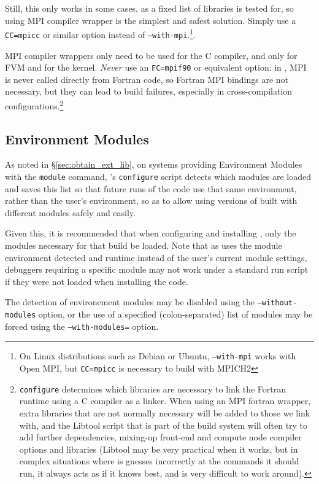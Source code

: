 \documentclass[a4paper,10pt,twoside]{article}
\begin{document}
Still, this only works in some cases, as a fixed list of libraries
is tested for, so using MPI compiler wrapper is the simplest and safest
solution. Simply use a \texttt{CC=mpicc} or similar option instead
of \texttt{--with-mpi}.\footnote{On Linux distributions such
as Debian or Ubuntu, \texttt{--with-mpi} works with Open MPI, but
\texttt{CC=mpicc} is necessary to build with MPICH2}.

MPI compiler wrappers only need to be used for the C compiler,
and only for FVM and for the kernel.
\emph{Never} use an \texttt{FC=mpif90}
or equivalent option: in \CS, MPI is never called directly from Fortran code,
so Fortran MPI bindings are not necessary, but they can lead to
build failures, especially in cross-compilation
configurations.\footnote{\texttt{configure} determines which libraries are
necessary to link the Fortran runtime using a C compiler as a linker.
When using an MPI fortran wrapper, extra libraries that are not normally
necessary will be added to those we link with, and the Libtool script
that is part of the build system will often try to add further dependencies,
mixing-up front-end and compute node compiler options and
libraries (Libtool may be very practical when it works, but in complex
situations where is guesses incorrectly at the commands it should run, it always
acts as if it knows best, and is very difficult to work around).}

\subsection{Environment Modules\label{sec:config:envmode}}

As noted in \S\ref{sec:obtain_ext_lib}, on systems providing
Environment Modules with the {\tt module} command, \CS's {\tt configure}
script detects which modules are loaded and saves
this list so that future runs of the code use that same environment,
rather than the user's environment, so as to allow using versions of
\CS built with different modules safely and easily.

Given this, it is recommended that when configuring and installing
\CS, only the modules necessary for that build be loaded.
Note that as \CS uses the module
environment detected and runtime instead of the user's current
module settings, debuggers requiring a specific module may
not work under a standard run script if they were not loaded when
installing the code.

The detection of environement modules may be disabled using the
\texttt{--without-modules} option,
or the use of a specified (colon-separated) list of modules
may be forced using the \texttt{--with-modules=} option.
\end{document}
